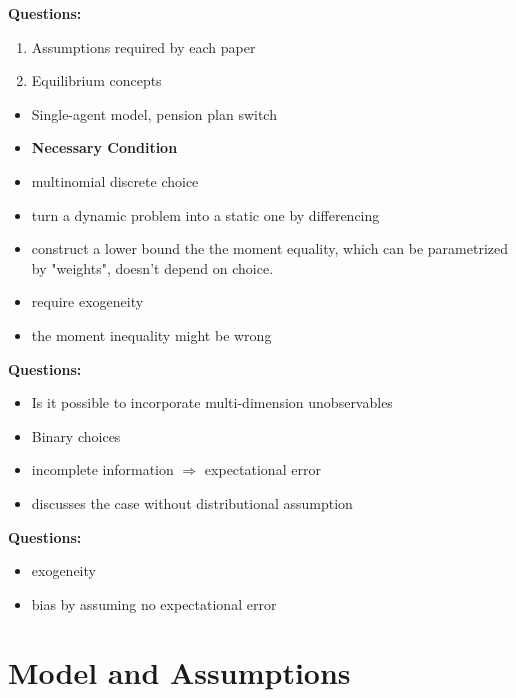 \documentclass[a4paper]{article}
\begin{document}
\bigskip

{\color{RedViolet} \textbf{Questions:} 
\begin{enumerate}
\item Assumptions required by each paper
\item Equilibrium concepts
\end{enumerate}

}

\textbf{\cite{illanes2016switching}}

\begin{itemize}
\item Single-agent model, pension plan switch
\item \textbf{Necessary Condition}
\item multinomial discrete choice
\item turn a dynamic problem into a static one by differencing
\item construct a lower bound the the moment equality, which can be parametrized by "weights", doesn't depend on choice.
\item require exogeneity
\item {\color{RedViolet} the moment inequality might be wrong}
\end{itemize}

{\color{RedViolet} \textbf{Questions:} 
\begin{itemize}
\item Is it possible to incorporate multi-dimension unobservables
\end{itemize}
}


\cite{dickstein2013accounting}
\begin{itemize}
\item Binary choices
\item incomplete information $\Rightarrow$ expectational error
\item discusses the case without distributional assumption
\end{itemize}



{\color{RedViolet} \textbf{Questions:} 
\begin{itemize}
\item exogeneity
\item bias by assuming no expectational error
\end{itemize}
}

\section{Model and Assumptions}
\end{document}
